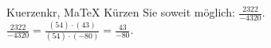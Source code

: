 \begin{MAufgabe}{Kuerzen}{kr, MaTeX}
K\"urzen Sie soweit m\"oglich: $\frac{2322}{-4320}$.\\ 
\ifLsg\MLoesung
\quad $\frac{2322}{-4320}=\frac{(54)\cdot(43)}{(54)\cdot(-80)}=\frac{43}{-80}$.\else\relax\fi
 \end{MAufgabe}